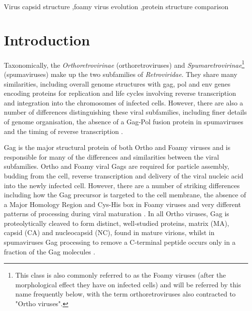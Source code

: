 \documentclass[preprint,12pt]{elsarticle}
\begin{document}
\begin{frontmatter}
\begin{keyword}
Virus capsid structure \sep foamy virus evolution \sep protein structure comparison


\end{keyword}

\end{frontmatter}

\linenumbers

\section{Introduction}

Taxonomically, the {\em Orthoretrovirinae} (orthoretroviruses) and {\em Spumaretrovirinae}\footnote{
This class is also commonly referred to as the Foamy viruses (after the morphological effect they have on infected cells)
and will be referred by this name frequently below, with the term orthoretroviruses also contracted to "Ortho viruses".
}
(spumaviruses) make up the two subfamilies of {\em Retroviridae}. They share many similarities, including overall genome
structures with gag, pol and env genes encoding proteins for replication and life cycles involving reverse transcription
and integration into the chromosomes of infected cells. However, there are also a number of differences distinguishing these
viral subfamilies, including finer details of genome organisation, the absence of a Gag-Pol fusion protein in spumaviruses
and the timing of reverse transcription \cite{LindemannDet11}.

Gag is the major structural protein of both Ortho and Foamy viruses and is responsible for many of the differences and
similarities between the viral subfamilies. Ortho and Foamy viral Gags are required for particle assembly, budding from the
cell, reverse transcription and delivery of the viral nucleic acid into the newly infected cell. However, there are a number
of striking differences including how the Gag precursor is targeted to the cell membrane, the absence of a Major Homology
Region and Cys-His box in Foamy viruses and very different patterns of processing during viral maturation \cite{MullersEet13}. 
In all Ortho viruses, Gag is proteolytically cleaved to form distinct, well-studied proteins, matrix (MA), capsid (CA) and 
nucleocapsid (NC), found in mature virions, whilst in spumaviruses Gag processing to remove a C-terminal peptide occurs 
only in a fraction of the Gag molecules \cite{FlugelRMet03}. 
\end{document}

